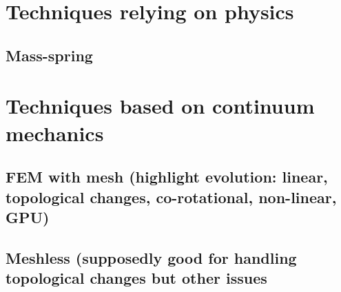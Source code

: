 	
	
	
	
	
	
\section{Techniques relying on physics}

	\subsection{Mass-spring}
		
\section{Techniques based on continuum mechanics}	

	\subsection{FEM with mesh (highlight evolution: linear, topological changes, co-rotational, non-linear, GPU)}
	
	\subsection{Meshless (supposedly good for handling topological changes but other issues}
	
	
	